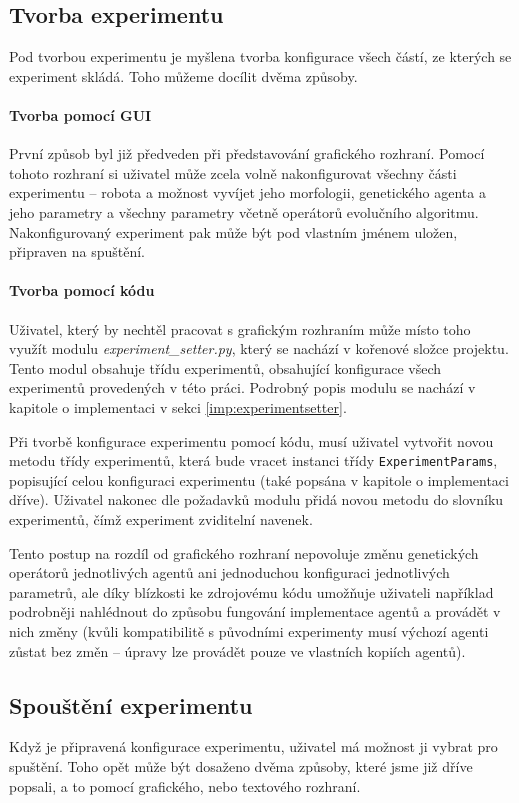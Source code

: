 \subsection{Tvorba experimentu} \label{doc_21_mise_en_place}

Pod tvorbou experimentu je myšlena tvorba konfigurace všech částí, ze kterých
se experiment skládá. Toho můžeme docílit dvěma způsoby. 

\paragraph{Tvorba pomocí GUI}
První způsob byl již předveden při představování grafického rozhraní.
Pomocí tohoto rozhraní si uživatel může zcela volně nakonfigurovat všechny
části experimentu -- robota a možnost vyvíjet jeho morfologii, genetického
agenta a jeho parametry a všechny parametry včetně operátorů evolučního
algoritmu. Nakonfigurovaný experiment pak může být pod vlastním jménem uložen,
připraven na spuštění.

\paragraph{Tvorba pomocí kódu}
Uživatel, který by nechtěl pracovat s grafickým rozhraním může místo toho
využít modulu \emph{experiment\_setter.py}, který se nachází v kořenové složce
projektu. Tento modul obsahuje třídu experimentů, obsahující konfigurace všech
experimentů provedených v této práci. Podrobný popis modulu se nachází v
kapitole o implementaci v sekci \ref{imp:experimentsetter}.

Při tvorbě konfigurace experimentu pomocí kódu, musí uživatel vytvořit novou
metodu třídy experimentů, která bude vracet instanci třídy
\texttt{ExperimentParams}, popisující celou konfiguraci experimentu (také
popsána v kapitole o implementaci dříve). Uživatel nakonec dle požadavků modulu
přidá novou metodu do slovníku experimentů, čímž experiment zviditelní navenek.

Tento postup na rozdíl od grafického rozhraní nepovoluje změnu genetických
operátorů jednotlivých agentů ani jednoduchou konfiguraci jednotlivých
parametrů, ale díky blízkosti ke zdrojovému kódu umožňuje uživateli například
podrobněji nahlédnout do způsobu fungování implementace agentů a provádět v
nich změny (kvůli kompatibilitě s původními experimenty musí výchozí agenti
zůstat bez změn -- úpravy lze provádět pouze ve vlastních kopiích agentů).

\subsection{Spouštění experimentu} \label{doc_22_cooking}
Když je připravená konfigurace experimentu, uživatel má možnost ji vybrat pro
spuštění. Toho opět může být dosaženo dvěma způsoby, které jsme již dříve
popsali, a to pomocí grafického, nebo textového rozhraní.

